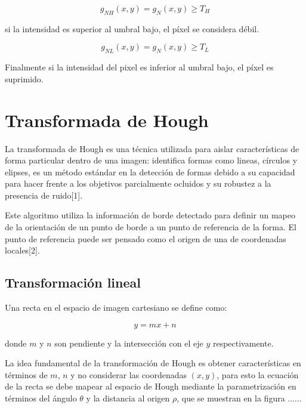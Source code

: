 \begin{equation}
g_{NH}(x,y) = g_{N}(x,y)\geq T_H
\end{equation}

si la intensidad es superior al umbral bajo, el píxel se considera débil.  

\begin{equation}
g_{NL}(x,y) = g_{N}(x,y)\geq T_L
\end{equation}

Finalmente si la intensidad del pixel es inferior al umbral bajo, el píxel es suprimido.

\section{Transformada de Hough}


La transformada de Hough es una técnica utilizada para aislar características de forma particular dentro de una imagen: identifica formas como lineas, círculos y elipses, es un método estándar en la detección de formas debido a su capacidad para hacer frente a los objetivos parcialmente ocluidos y su robustez a la presencia de ruido[1].

Este algoritmo utiliza la información de borde detectado para definir un mapeo de la orientación de un punto de borde a un punto de referencia de la forma. El punto de referencia puede ser pensado como el origen de una de coordenadas locales[2].

\subsection{Transformación lineal}

Una recta en el espacio de imagen cartesiano se define como:

\begin{equation}
y=mx+n
\end{equation}

donde $m$ y $n$ son pendiente y la intersección con el eje $y$ respectivamente. 

La idea fundamental de la transformación de Hough es obtener características en términos de $m$, $n$ y no considerar las coordenadas $(x,y)$, para esto la ecuación de la recta se debe mapear al espacio de Hough mediante la parametrización en términos del ángulo $\theta$ y la distancia al origen $\rho$, que se muestran en la figura ......%

%


